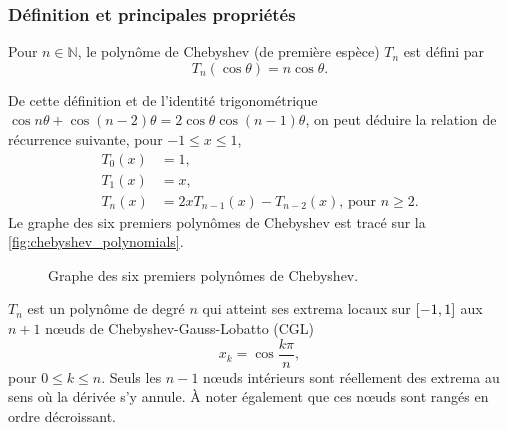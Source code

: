 \subsubsection{Définition et principales propriétés}
\begin{definition}
	Pour $n \in \mathbb{N}$, le polynôme de Chebyshev (de première espèce) $T_n$ est défini par%
	\begin{equation}
		T_n(\cos \theta) = n \cos \theta.
		\label{eq:chebyshev_trigo}
	\end{equation}
\end{definition}
De cette définition et de l'identité trigonométrique $\cos n\theta + \cos (n-2)\theta = 2\cos \theta \cos (n-1)\theta$, on peut déduire la relation de récurrence suivante, pour $-1 \leq x \leq 1$, 
\begin{align}[left = \empheqlbrace\,]
	T_0(x) &= 1, \nonumber\\
	T_1(x) &= x, \nonumber\\
	T_n(x) &= 2x T_{n-1}(x) - T_{n-2}(x) \text{,\ pour\ } n \geq 2.
	\label{eq:chebyshev_recurrence}
\end{align}
Le graphe des six premiers polynômes de Chebyshev est tracé sur la \autoref{fig:chebyshev_polynomials}.\par

\begin{figure}
	\centering
	
	\caption{Graphe des six premiers polynômes de Chebyshev.}%
	\label{fig:chebyshev_polynomials}
\end{figure}

$T_n$ est un polynôme de degré $n$ %
qui atteint ses extrema locaux sur $\left[ -1, 1 \right]$ aux $n+1$ n\oe uds de Chebyshev-Gauss-Lobatto (CGL)%
\begin{equation}
	x_k = \cos \frac{k \pi}{n},
	\label{eq:cgl_nodes}
\end{equation}
pour $0 \leq k \leq n$. 
Seuls les $n-1$ n\oe uds intérieurs sont réellement des extrema au sens où la dérivée s'y annule. 
À noter également que ces n\oe uds sont rangés en ordre décroissant.\par

